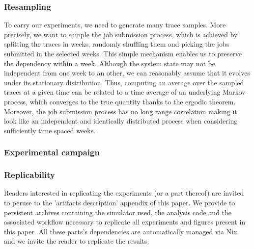 \documentclass[sigconf]{acmart}
\begin{document}
\subsubsection{Resampling}
\label{ssub:resampling}



To carry our experiments, we need to generate many trace samples. More precisely, we want
to sample the job submission process, which is achieved by splitting the traces in weeks,
randomly shuffling them and picking the jobs submitted in the selected weeks.  This simple
mechanism enables us to preserve the dependency within a week. Although the system state
may not be independent from one week to an other, we can reasonably assume that it evolves
under its stationary distribution. Thus, computing an average over the sampled traces at a
given time can be related to a time average of an underlying Markov process, which
converges to the true quantity thanks to the ergodic theorem.  Moreover, the job
submission process has no long range correlation making it look like an independent and
identically distributed process when considering sufficiently time spaced weeks.

\subsubsection{Experimental campaign}


\subsubsection{Replicability}

Readers interested in replicating the experiments (or a part thereof) are
invited to peruse to the 'artifacts description' appendix of this paper.  We
provide to persistent archives containing the simulator used, the analysis code
and the associated workflow necessary to replicate all experiments and figures
present in this paper. All these parts's dependencies are automatically managed
via Nix~\cite{nix} and we invite the reader to replicate the results.
\end{document}
